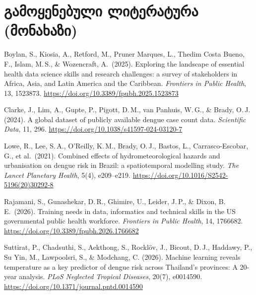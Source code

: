 \documentclass[11pt,a4paper]{article}
\begin{document}
\section*{გამოყენებული ლიტერატურა (მონახაზი)}
\begin{small}
\begin{description}[nosep,leftmargin=1em,labelindent=0pt]
\item Boylan, S., Kiosia, A., Retford, M., Pruner Marques, L., Thedim Costa Bueno, F.,
  Islam, M.\,S., \& Wozencraft, A.\ (2025). Exploring the landscape of essential
  health data science skills and research challenges: a survey of stakeholders in
  Africa, Asia, and Latin America and the Caribbean. \emph{Frontiers in Public
  Health}, 13, 1523873. \url{https://doi.org/10.3389/fpubh.2025.1523873}
\item Clarke, J., Lim, A., Gupte, P., Pigott, D.\,M., van Panhuis, W.\,G., \&
  Brady, O.\,J. (2024). A global dataset of publicly available dengue case count
  data. \emph{Scientific Data}, 11, 296.
  \url{https://doi.org/10.1038/s41597-024-03120-7}
\item Lowe, R., Lee, S.\,A., O'Reilly, K.\,M., Brady, O.\,J., Bastos, L.,
  Carrasco-Escobar, G., et al.\ (2021). Combined effects of hydrometeorological
  hazards and urbanisation on dengue risk in Brazil: a spatiotemporal modelling
  study. \emph{The Lancet Planetary Health}, 5(4), e209--e219.
  \url{https://doi.org/10.1016/S2542-5196(20)30292-8}
\item Rajamani, S., Gunashekar, D.\,R., Ghimire, U., Leider, J.\,P., \& Dixon, B.\,E.\
  (2026). Training needs in data, informatics and technical skills in the US
  governmental public health workforce. \emph{Frontiers in Public Health}, 14,
  1766682. \url{https://doi.org/10.3389/fpubh.2026.1766682}
\item Suttirat, P., Chadsuthi, S., Aekthong, S., Rocklöv, J., Bicout, D.\,J.,
  Haddawy, P., Su Yin, M., Lawpoolsri, S., \& Modchang, C. (2026). Machine
  learning reveals temperature as a key predictor of dengue risk across
  Thailand's provinces: A 20-year analysis. \emph{PLoS Neglected Tropical
  Diseases}, 20(7), e0014590.
  \url{https://doi.org/10.1371/journal.pntd.0014590}
\end{description}
\end{small}
\end{document}
